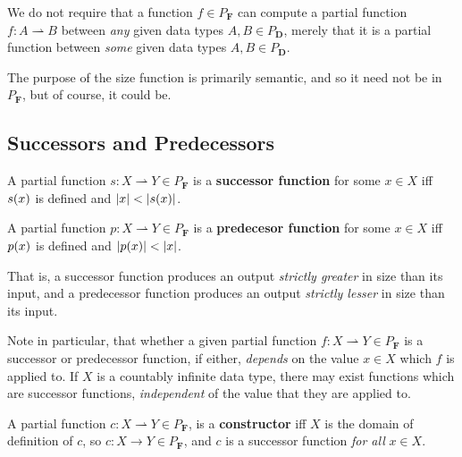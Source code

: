 \begin{remark} We do not require that a function $f \in P_\mathbf{F}$ can
compute a partial function $f : A \rightharpoonup B$ between \emph{any} given
data types $A, B \in P_\mathbf{D}$, merely that it is a partial function
between \emph{some} given data types $A, B \in P_\mathbf{D}$.  \end{remark}

\begin{remark} The purpose of the size function is primarily semantic, and so
it need not be in $P_\mathbf{F}$, but of course, it could be. \end{remark}

\subsection{Successors and Predecessors}

\begin{definition} A partial function $s : X \rightharpoonup Y \in
P_\mathbf{F}$ is a \textbf{successor function} for some $x \in X$ iff $s{\mathopen{}\left({x}\right)\mathclose{}}$
is defined and ${\mathopen{}\left|{x}\right|\mathclose{}} < {\mathopen{}\left|{s{\mathopen{}\left({x}\right)\mathclose{}}}\right|\mathclose{}}$. \end{definition}

\begin{definition} A partial function $p : X \rightharpoonup Y \in
P_\mathbf{F}$ is a \textbf{predecesor function} for some $x \in X$ iff $p{\mathopen{}\left({x}\right)\mathclose{}}$
is defined and ${\mathopen{}\left|{p{\mathopen{}\left({x}\right)\mathclose{}}}\right|\mathclose{}} < {\mathopen{}\left|{x}\right|\mathclose{}}$. \end{definition}

That is, a successor function produces an output \emph{strictly greater} in
size than its input, and a predecessor function produces an output
\emph{strictly lesser} in size than its input.

Note in particular, that whether a given partial function $f : X
\rightharpoonup Y \in P_\mathbf{F}$ is a successor or predecessor function, if
either, \emph{depends} on the value $x \in X$ which $f$ is applied to. If $X$
is a countably infinite data type, there may exist functions which are
successor functions, \emph{independent} of the value that they are applied to.

\begin{definition} A partial function $c : X \rightharpoonup Y \in
P_\mathbf{F}$, is a \textbf{constructor} iff $X$ is the domain of definition of
$c$, so $c : X \rightarrow Y \in P_\mathbf{F}$, and $c$ is a successor function
\emph{for all} $x \in X$. \end{definition}

